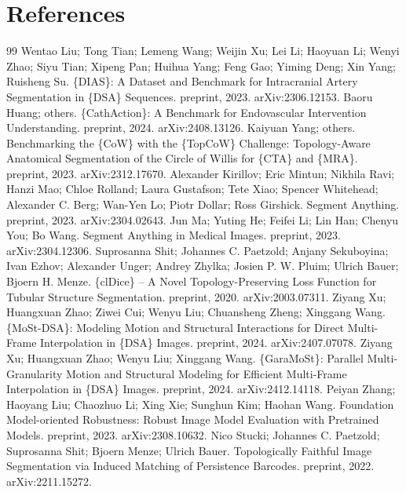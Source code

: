 \documentclass[11pt]{article}
\begin{document}
\section*{References}
\begin{thebibliography}{99}
 Wentao Liu; Tong Tian; Lemeng Wang; Weijin Xu; Lei Li; Haoyuan Li; Wenyi Zhao; Siyu Tian; Xipeng Pan; Huihua Yang; Feng Gao; Yiming Deng; Xin Yang; Ruisheng Su. \{DIAS\}: A Dataset and Benchmark for Intracranial Artery Segmentation in \{DSA\} Sequences. preprint, 2023. arXiv:2306.12153.
 Baoru Huang; others. \{CathAction\}: A Benchmark for Endovascular Intervention Understanding. preprint, 2024. arXiv:2408.13126.
 Kaiyuan Yang; others. Benchmarking the \{CoW\} with the \{TopCoW\} Challenge: Topology-Aware Anatomical Segmentation of the Circle of Willis for \{CTA\} and \{MRA\}. preprint, 2023. arXiv:2312.17670.
 Alexander Kirillov; Eric Mintun; Nikhila Ravi; Hanzi Mao; Chloe Rolland; Laura Gustafson; Tete Xiao; Spencer Whitehead; Alexander C. Berg; Wan-Yen Lo; Piotr Dollar; Ross Girshick. Segment Anything. preprint, 2023. arXiv:2304.02643.
 Jun Ma; Yuting He; Feifei Li; Lin Han; Chenyu You; Bo Wang. Segment Anything in Medical Images. preprint, 2023. arXiv:2304.12306.
 Suprosanna Shit; Johannes C. Paetzold; Anjany Sekuboyina; Ivan Ezhov; Alexander Unger; Andrey Zhylka; Josien P. W. Pluim; Ulrich Bauer; Bjoern H. Menze. \{clDice\} -- A Novel Topology-Preserving Loss Function for Tubular Structure Segmentation. preprint, 2020. arXiv:2003.07311.
 Ziyang Xu; Huangxuan Zhao; Ziwei Cui; Wenyu Liu; Chuansheng Zheng; Xinggang Wang. \{MoSt-DSA\}: Modeling Motion and Structural Interactions for Direct Multi-Frame Interpolation in \{DSA\} Images. preprint, 2024. arXiv:2407.07078.
 Ziyang Xu; Huangxuan Zhao; Wenyu Liu; Xinggang Wang. \{GaraMoSt\}: Parallel Multi-Granularity Motion and Structural Modeling for Efficient Multi-Frame Interpolation in \{DSA\} Images. preprint, 2024. arXiv:2412.14118.
 Peiyan Zhang; Haoyang Liu; Chaozhuo Li; Xing Xie; Sunghun Kim; Haohan Wang. Foundation Model-oriented Robustness: Robust Image Model Evaluation with Pretrained Models. preprint, 2023. arXiv:2308.10632.
 Nico Stucki; Johannes C. Paetzold; Suprosanna Shit; Bjoern Menze; Ulrich Bauer. Topologically Faithful Image Segmentation via Induced Matching of Persistence Barcodes. preprint, 2022. arXiv:2211.15272.
\end{thebibliography}
\end{document}
